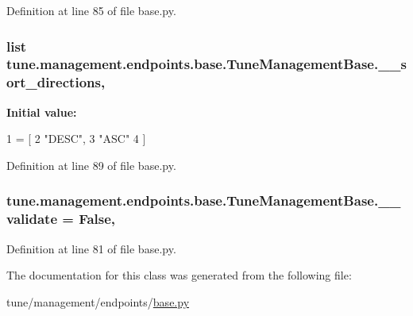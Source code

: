 Definition at line 85 of file base.\-py.

\hypertarget{classtune_1_1management_1_1endpoints_1_1base_1_1TuneManagementBase_aeffbf18313b470d8d8feec8ee8916aaa}{
\subsubsection[{\-\_\-\-\_\-sort\-\_\-directions}]{\setlength{\rightskip}{0pt plus 5cm}list tune.\-management.\-endpoints.\-base.\-Tune\-Management\-Base.\-\_\-\-\_\-sort\-\_\-directions\hspace{0.3cm}{\ttfamily [static]}, {\ttfamily [private]}}}\label{classtune_1_1management_1_1endpoints_1_1base_1_1TuneManagementBase_aeffbf18313b470d8d8feec8ee8916aaa}
{\bfseries Initial value\-:}
\begin{DoxyCode}
1 = [
2         \textcolor{stringliteral}{"DESC"},
3         \textcolor{stringliteral}{"ASC"}
4         ]
\end{DoxyCode}


Definition at line 89 of file base.\-py.

\hypertarget{classtune_1_1management_1_1endpoints_1_1base_1_1TuneManagementBase_a1cbfd5de3682af94b39f02abfd89e1dc}{
\subsubsection[{\-\_\-\-\_\-validate}]{\setlength{\rightskip}{0pt plus 5cm}tune.\-management.\-endpoints.\-base.\-Tune\-Management\-Base.\-\_\-\-\_\-validate = False\hspace{0.3cm}{\ttfamily [static]}, {\ttfamily [private]}}}\label{classtune_1_1management_1_1endpoints_1_1base_1_1TuneManagementBase_a1cbfd5de3682af94b39f02abfd89e1dc}


Definition at line 81 of file base.\-py.



The documentation for this class was generated from the following file\-:\begin{DoxyCompactItemize}
\item 
tune/management/endpoints/\hyperlink{base_8py}{base.\-py}\end{DoxyCompactItemize}
